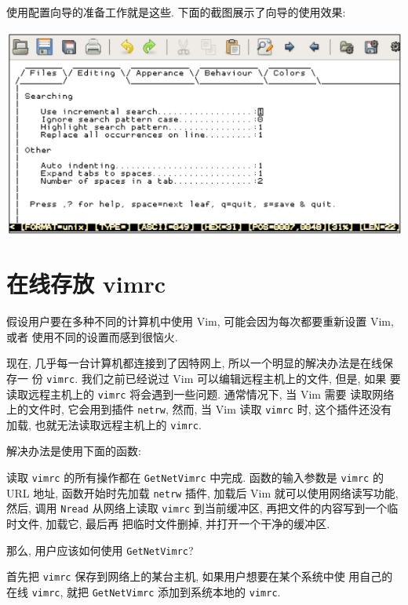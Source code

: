 使用配置向导的准备工作就是这些. 下面的截图展示了向导的使用效果:
\begin{center}
\includegraphics[scale=0.7]{./images/page221.png}
\end{center}

\section{在线存放 vimrc}
\label{sec:storing_vimrc_online}

假设用户要在多种不同的计算机中使用 Vim, 可能会因为每次都要重新设置 Vim, 或者
使用不同的设置而感到很恼火.

现在, 几乎每一台计算机都连接到了因特网上, 所以一个明显的解决办法是在线保存一
份 \texttt{vimrc}. 我们之前已经说过 Vim 可以编辑远程主机上的文件, 但是, 如果
要读取远程主机上的 \texttt{vimrc} 将会遇到一些问题. 通常情况下, 当 Vim 需要
读取网络上的文件时, 它会用到插件 \texttt{netrw}, 然而, 当 Vim 读取
\texttt{vimrc} 时, 这个插件还没有加载, 也就无法读取远程主机上的 \texttt{vimrc}.

解决办法是使用下面的函数:
读取 \texttt{vimrc} 的所有操作都在 \texttt{GetNetVimrc} 中完成. 函数的输入参数是
\texttt{vimrc} 的 URL 地址, 函数开始时先加载 \texttt{netrw} 插件, 加载后
Vim 就可以使用网络读写功能, 然后, 调用 \texttt{Nread} 从网络上读取
\texttt{vimrc} 到当前缓冲区, 再把文件的内容写到一个临时文件, 加载它, 最后再
把临时文件删掉, 并打开一个干净的缓冲区.

那么, 用户应该如何使用 \texttt{GetNetVimrc}?

首先把 \texttt{vimrc} 保存到网络上的某台主机, 如果用户想要在某个系统中使
用自己的在线 \texttt{vimrc}, 就把 \texttt{GetNetVimrc} 添加到系统本地的
\texttt{vimrc}.

